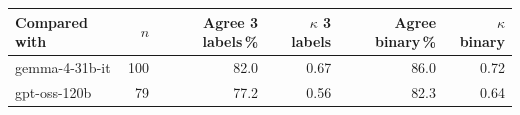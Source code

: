 \begin{tabular}{@{}lrrrrr@{}}
\toprule
Compared with & $n$ & Agree 3 labels\,\% & $\kappa$ 3 labels & Agree binary\,\% & $\kappa$ binary \\
\midrule
gemma-4-31b-it & 100 & 82.0 & 0.67 & 86.0 & 0.72 \\
gpt-oss-120b & 79 & 77.2 & 0.56 & 82.3 & 0.64 \\
\bottomrule
\end{tabular}
